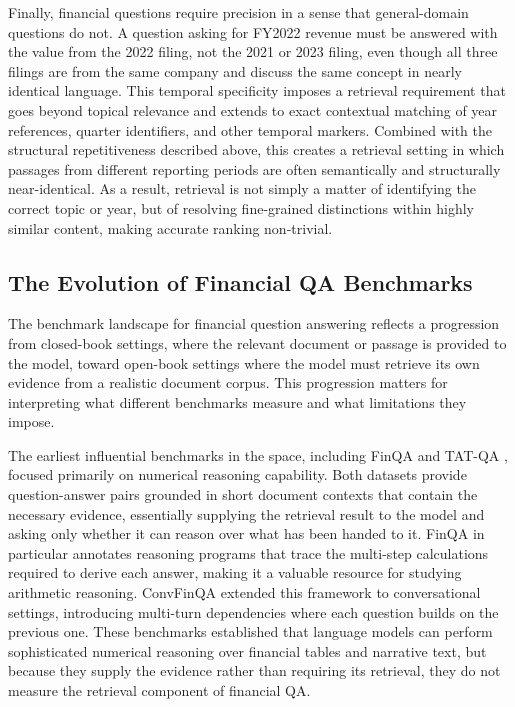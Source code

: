\documentclass[12pt,twoside,maitrise]{dms}
\theoremstyle{definition}
\numberwithin{equation}{section}
\numberwithin{table}{chapter}
\numberwithin{figure}{chapter}
\begin{document}
Finally, financial questions require precision in a sense that general-domain questions
do not. A question asking for FY2022 revenue must be answered with the value from the
2022 filing, not the 2021 or 2023 filing, even though all three filings are from the
same company and discuss the same concept in nearly identical language. This temporal
specificity imposes a retrieval requirement that goes beyond topical relevance and
extends to exact contextual matching of year references, quarter identifiers, and other
temporal markers. Combined with the structural repetitiveness described above, this creates a
retrieval setting in which passages from different reporting periods are often
semantically and structurally near-identical. As a result, retrieval is not
simply a matter of identifying the correct topic or year, but of resolving fine-grained distinctions within highly similar content, making accurate ranking
non-trivial.

\subsection{The Evolution of Financial QA Benchmarks}

The benchmark landscape for financial question answering reflects a progression from
closed-book settings, where the relevant document or passage is provided to the model,
toward open-book settings where the model must retrieve its own evidence from a realistic
document corpus. This progression matters for interpreting what different benchmarks
measure and what limitations they impose.

The earliest influential benchmarks in the space, including FinQA \citep{chen2021finqa}
and TAT-QA \citep{zhu2021tatqa}, focused primarily on numerical reasoning capability.
Both datasets provide question-answer pairs grounded in short document contexts that
contain the necessary evidence, essentially supplying the retrieval result to the model
and asking only whether it can reason over what has been handed to it. FinQA in
particular annotates reasoning programs that trace the multi-step calculations required
to derive each answer, making it a valuable resource for studying arithmetic reasoning.
ConvFinQA \citep{chen2022convfinqa} extended this framework to conversational settings,
introducing multi-turn dependencies where each question builds on the previous one.
These benchmarks established that language models can perform sophisticated numerical
reasoning over financial tables and narrative text, but because they supply the evidence
rather than requiring its retrieval, they do not measure the retrieval component of
financial QA.
\end{document}
